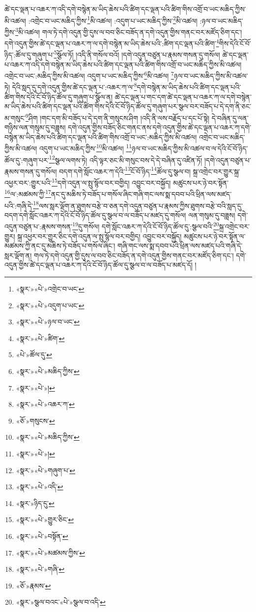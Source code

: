 ཚེ་དང་ལྡན་པ་འཆར་ཀ་འདི་དགེ་བསྙེན་མ་ཡིད་ཆེས་པའི་ཚིག་དང་ལྡན་པའི་ཚིག་གིས་འགྲོ་བ་ཡང་མཆིད་ཀྱིས་མི་འཚལ། :འགྲེང་བ་ཡང་མཆིད་ཀྱིས་\footnote{«སྣར་»«པེ་»འགྲེང་བ་ཡང་}མི་འཚལ། :འདུག་པ་ཡང་མཆིད་ཀྱིས་\footnote{«སྣར་»«པེ་»འདུག་པ་ཡང་}མི་འཚལ། :ཉལ་བ་ཡང་མཆིད་ཀྱིས་\footnote{«སྣར་»«པེ་»ཉལ་བ་ཡང་}མི་འཚལ། གལ་ཏེ་དགེ་འདུན་གྱི་དུས་ལ་བབ་ཅིང་བཟོད་ན་དགེ་འདུན་གྱིས་གནང་བར་མཛོད་ཅིག་དང་། དགེ་འདུན་གྱིས་ཚེ་དང་ལྡན་པ་འཆར་ཀ་ལ་དགེ་བསྙེན་མ་ཡིད་ཆེས་པའི་:ཚིག་དང་ལྡན་པའི་ཚིག་\footnote{«སྣར་»«པེ་»ཚིག་}གིས་དེའི་ངོ་བོ་ཉིད་:ཚོལ་དུ་གཞུག་པ་\footnote{«པེ་»ཚོལ་དུ་}སྩོལ་ཏོ། །འདི་ནི་གསོལ་བའོ། །དགེ་འདུན་བཙུན་པ་རྣམས་གསན་དུ་གསོལ། ཚེ་དང་ལྡན་པ་འཆར་ཀ་འདི་དགེ་བསྙེན་མ་ཡིད་ཆེས་པའི་ཚིག་དང་ལྡན་པའི་ཚིག་གིས་འགྲོ་བ་ཡང་མཆིད་ཀྱིས་མི་འཚལ། འགྲེང་བ་ཡང་:མཆིད་ཀྱིས་མི་འཚལ། འདུག་པ་ཡང་མཆིད་ཀྱིས་\footnote{«སྣར་»«པེ་»མཆིད་ཀྱིས་}མི་འཚལ། \footnote{«སྣར་»«པེ་»།  }ཉལ་བ་ཡང་མཆིད་ཀྱིས་མི་འཚལ་ཏེ། དེའི་སླད་དུ་དགེ་འདུན་གྱིས་ཚེ་དང་ལྡན་པ་:འཆར་ཀ་ལ་\footnote{«སྣར་»«པེ་»འཆར་ཀ་}དགེ་བསྙེན་མ་ཡིད་ཆེས་པའི་ཚིག་དང་ལྡན་པའི་ཚིག་གིས་དེའི་ངོ་བོ་ཉིད་ཚོལ་དུ་གཞུག་པ་སྩོལ་ན། ཚེ་དང་ལྡན་པ་གང་དག་ཚེ་དང་ལྡན་པ་འཆར་ཀ་ལ་དགེ་བསྙེན་མ་ཡིད་ཆེས་པའི་ཚིག་དང་ལྡན་པའི་ཚིག་གིས་དེའི་ངོ་བོ་ཉིད་ཚོལ་དུ་གཞུག་པར་སྩལ་བར་བཟོད་པ་དེ་དག་ནི་ཅང་མ་གསུང་\footnote{«ཅོ་»གསུངས་}ཤིག །གང་དག་མི་བཟོད་པ་དེ་དག་ནི་གསུངས་ཤིག །འདི་ནི་ལས་བརྗོད་པ་དང་པོ་སྟེ། དེ་བཞིན་དུ་ལན་གཉིས་ལན་གསུམ་དུ་བཟླས། དགེ་འདུན་གྱིས་བཟོད་ཅིང་གནང་ནས་དགེ་འདུན་གྱིས་ཚེ་དང་ལྡན་པ་འཆར་ཀ་དགེ་བསྙེན་མ་ཡིད་ཆེས་པའི་ཚིག་དང་ལྡན་པའི་ཚིག་གིས་འགྲོ་བ་ཡང་:མཆིད་ཀྱིས་མི་འཚལ། འགྲེང་བ་ཡང་མཆིད་ཀྱིས་མི་འཚལ། འདུག་པ་ཡང་མཆིད་ཀྱིས་\footnote{«སྣར་»«པེ་»མཆིད་ཀྱིས་}མི་འཚལ། \footnote{«སྣར་»«པེ་»།  }ཉལ་བ་ཡང་མཆིད་ཀྱིས་མི་འཚལ་བ་ལ་དེའི་ངོ་བོ་ཉིད་ཚོལ་དུ་:གཞུག་པར་\footnote{«སྣར་»«པེ་»གཞུག་པ་}སྩལ་ལགས་ཏེ། འདི་ལྟར་ཅང་མི་གསུང་བས་དེ་དེ་བཞིན་དུ་འཛིན་ཏོ། །དགེ་འདུན་བཙུན་པ་རྣམས་གསན་དུ་གསོལ། བདག་དགེ་སློང་འཆར་ཀ་དེའི་\footnote{«སྣར་»«པེ་»འདི་}ངོ་བོ་ཉིད་\footnote{«སྣར་»ཉིད་དུ་}ཚོལ་དུ་སྩལ་བ། སྐྲ་འགྲེང་བར་གྱུར་སྐྲ་འཕྱར་བར་:གྱུར་པའི་\footnote{«སྣར་»«པེ་»གྱུར་ཅིང་}དགེ་འདུན་ལ་སྤུ་སྙོལ་བར་བགྱིད། འབྱུང་བར་བསྐྱོད། མཚུངས་པར་ཉེ་བར་སྟོན་\footnote{«སྣར་»«པེ་»བསྟོན་}ལ་:མཚམས་ཀྱི་\footnote{«སྣར་»«པེ་»མཚམས་ཀྱིས་}ནང་དུ་མཆིས་ཏེ་བཟོད་པ་གསོལ་ཞིང་གཞི་གང་ལས་སྨ་དབབ་པའི་ཕྲིན་ལས་མཛད་པའི་:གཞི་དེ་\footnote{«སྣར་»«པེ་»གཞི་}ལས་སླར་ལྡོག་ན་ཐུགས་བརྩེ་བ་ཅན་དགེ་འདུན་བཙུན་པ་རྣམས་ཀྱིས་ཐུགས་བརྩེ་བའི་སླད་དུ་བདག་དགེ་སློང་འཆར་ཀ་དེའི་ངོ་བོ་ཉིད་ཚོལ་དུ་སྩལ་བ་ལ་བཟོད་པ་མཛད་དུ་གསོལ། ལན་གསུམ་དུ་བཟླས། དགེ་འདུན་བཙུན་པ་:རྣམས་གསན་\footnote{«ཅོ་»རྣམས་}དུ་གསོལ། དགེ་སློང་འཆར་ཀ་དེའི་ངོ་བོ་ཉིད་ཚོལ་དུ་:སྩལ་བའི་\footnote{«སྣར་»སྩལ་བའང་«པེ་»སྩལ་བ་འདི་}སྐྲ་འགྲེང་བར་གྱུར། སྐྲ་འཕྱར་བར་གྱུར་ཅིང་དགེ་འདུན་ལ་སྤུ་སྙོལ་བར་བགྱིད། འབྱུང་བར་བསྐྱོད། མཚུངས་པར་ཉེ་བར་སྟོན་ལ་མཚམས་ཀྱི་ནང་དུ་མཆིས་ཏེ་བཟོད་པ་གསོལ་ཞིང་། གཞི་གང་ལས་སྨ་དབབ་པའི་ཕྲིན་ལས་མཛད་པའི་གཞི་དེ་སླར་ལྡོག་ན། གལ་ཏེ་དགེ་འདུན་གྱི་དུས་ལ་བབ་ཅིང་བཟོད་ན་དགེ་འདུན་གྱིས་གནང་བར་མཛོད་ཅིག་དང་། དགེ་འདུན་གྱིས་ཚེ་དང་ལྡན་པ་འཆར་ཀ་དེའི་ངོ་བོ་ཉིད་ཚོལ་དུ་སྩལ་བ་ལ་བཟོད་པ་མཛད་དོ། །
